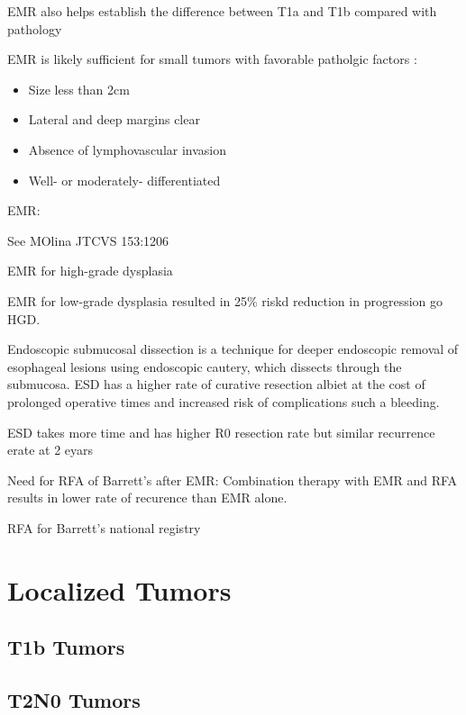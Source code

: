 \documentclass[
]{book}
\providecommand{\tightlist}{%
  \setlength{\itemsep}{0pt}\setlength{\parskip}{0pt}}
\begin{document}
EMR also helps establish the difference between T1a and T1b compared with pathology \citep{worrell484}

EMR is likely sufficient for small tumors with favorable patholgic factors\citep{pech652} \citep{nurkin1090}:

\begin{itemize}
\tightlist
\item
  Size less than 2cm
\item
  Lateral and deep margins clear
\item
  Absence of lymphovascular invasion
\item
  Well- or moderately- differentiated
\end{itemize}

EMR: \citep{soetikno4490}

See MOlina JTCVS 153:1206

EMR for high-grade dysplasia \citep{shaheen2277}

EMR for low-grade dysplasia \citep{phoa1209} resulted in 25\% riskd reduction in progression go HGD.

Endoscopic submucosal dissection is a technique for deeper endoscopic removal of esophageal lesions using endoscopic cautery, which dissects through the submucosa. ESD has a higher rate of curative resection \citep{cao751} albiet at the cost of prolonged operative times and increased risk of complications such a bleeding. \citep{repici715}

ESD takes more time and has higher R0 resection rate but similar recurrence erate at 2 eyars \citep{terheggen783}

Need for RFA of Barrett's after EMR: \citep{haidry87} Combination therapy with EMR and RFA results in lower rate of recurence than EMR alone.\citep{pech1200}

RFA for Barrett's national registry \citep{ganz35}

\hypertarget{localized}{%
\chapter{Localized Tumors}\label{localized}}

\hypertarget{t1b-tumors}{%
\section{T1b Tumors}\label{t1b-tumors}}

\hypertarget{t2n0-tumors}{%
\section{T2N0 Tumors}\label{t2n0-tumors}}
\end{document}
